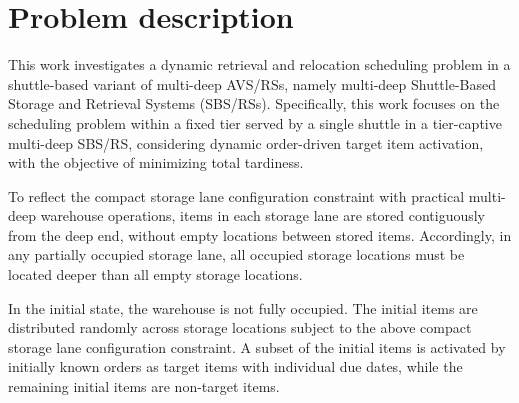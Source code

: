 \chapter{Problem description}\label{chap:Problem description}
This work investigates a dynamic retrieval and relocation scheduling problem in a shuttle-based variant of multi-deep AVS/RSs, namely multi-deep Shuttle-Based Storage and Retrieval Systems (SBS/RSs). Specifically, this work focuses on the scheduling problem within a fixed tier served by a single shuttle in a tier-captive multi-deep SBS/RS, considering dynamic order-driven target item activation, with the objective of minimizing total tardiness. 

To reflect the compact storage lane configuration constraint with practical multi-deep warehouse operations, items in each storage lane are stored contiguously from the deep end, without empty locations between stored items. Accordingly, in any partially occupied storage lane, all occupied storage locations must be located deeper than all empty storage locations. 



In the initial state, the warehouse is not fully occupied. The initial items are distributed randomly across storage locations subject to the above compact storage lane configuration constraint. A subset of the initial items is activated by initially known orders as target items with individual due dates, while the remaining initial items are non-target items. 




